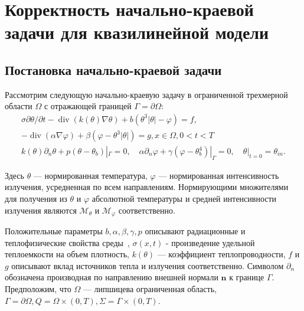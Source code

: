 \section{Корректность начально-краевой задачи для квазилинейной модели}
\label{sec:ch3:sec1}

\subsection{Постановка начально-краевой задачи}
\label{subsec:ch3/sec1/model}

Рассмотрим следующую начально-краевую задачу
в ограниченной трехмерной области $\Omega$ с
отражающей границей $\Gamma=\partial \Omega$:
\begin{gather}
    \sigma \partial \theta / \partial t
    -\operatorname{div}(k(\theta) \nabla \theta)
    +b\left(\theta^{3}|\theta|
    -\varphi\right)=f, \label{eq:3_1:1} \\
    -\operatorname{div}(\alpha \nabla \varphi)
    + \beta\left(\varphi-\theta^{3}|\theta|\right)=g,
    x \in \Omega, 0<t<T \label{eq:3_1:2}\\
    k(\theta) \partial_{n} \theta
    + p\left(\theta-\theta_{b}\right)|_{\Gamma}=0,
    \quad \alpha \partial_{n} \varphi
    + \gamma\left(\varphi-\theta_{b}^{4}\right)|_{\Gamma}=0,
    \quad \theta|_{t=0}=\theta_{i n}. \label{eq:3_1:3}
\end{gather}



Здесь $\theta$ — нормированная температура, $\varphi$ — нормированная интенсивность излучения,
усредненная по всем направлениям.
Нормирующими множителями для получения из
$\theta$ и $\varphi$ абсолютной температуры и средней интенсивности излучения
являются $\mathcal{M}_{\theta}$ и $\mathcal{M}_{\varphi}$ соответственно.


Положительные параметры $b, \alpha, \beta, \gamma, p$ описывают радиационные
и теплофизические свойства среды~\cite{Chebotarev2017}, $\sigma(x, t)$ - произведение
удельной теплоемкости на объем плотность, $k(\theta)$ — коэффициент теплопроводности,
$f$ и $g$ описывают вклад источников тепла и излучения соответственно.
Символом $\partial_{n}$ обозначена производная по направлению внешней
нормали $\mathbf{n}$ к границе $\Gamma$.
Предположим, что $\Omega$ — липшицева ограниченная область,
$\Gamma=\partial \Omega, Q=\Omega \times(0, T), \Sigma=\Gamma \times(0, T)$.

